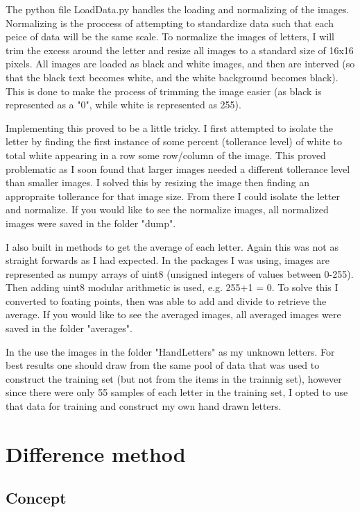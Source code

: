 \documentclass[a4paper]{article}
\begin{document}
The python file LoadData.py handles the loading and normalizing of the images. Normalizing is the proccess of attempting to standardize data such that each peice of data will be the same scale. To normalize the images of letters, I will trim the excess around the letter and resize all images to a standard size of 16x16 pixels. All images are loaded as black and white images, and then are interved (so that the black text becomes white, and the white background becomes black). This is done to make the process of trimming the image easier (as black is represented as a "0", while white is represented as 255).

Implementing this proved to be a little tricky. I first attempted to isolate the letter by finding the first instance of some percent (tollerance level) of white to total white appearing in a row some row/column of the image. This proved problematic as I soon found that larger images needed a different tollerance level than smaller images. I solved this by resizing the image then finding an appropraite tollerance for that image size. From there I could isolate the letter and normalize. If you would like to see the normalize images, all normalized images were saved in the folder "dump". 

I also built in methods to get the average of each letter. Again this was not as straight forwards as I had expected. In the packages I was using, images are represented as numpy arrays of uint8 (unsigned integers of values between 0-255). Then adding uint8 modular arithmetic is used, e.g. 255+1 = 0. To solve this I converted to foating points, then was able to add and divide to retrieve the average. If you would like to see the averaged images, all averaged images were saved in the folder "averages". 

In the use the images in the folder "HandLetters" as my unknown letters. For best results one should draw from the same pool of data that was used to construct the training set (but not from the items in the trainnig set), however since there were only 55 samples of each letter in the training set, I opted to use that data for training and construct my own hand drawn letters.

\section{Difference method}

\subsection{Concept}
\end{document}
